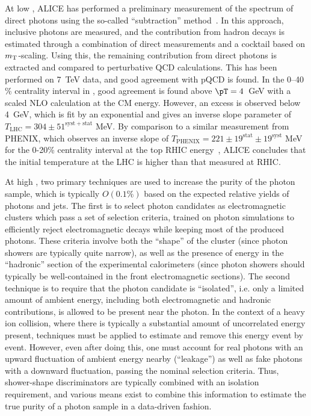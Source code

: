 At low \pT, ALICE has performed a preliminary measurement of the spectrum of direct photons
using the so-called ``subtraction'' method~\cite{Wilde:2012wc}.
In this approach, inclusive photons are measured,
and the contribution from hadron decays is estimated through a combination of direct measurements
and a cocktail based on $m_{\rm T}$-scaling.
Using this, the remaining contribution from direct photons is extracted and compared to
perturbative QCD calculations.  This has been performed on 7~TeV \pp data, and good agreement
with pQCD is found.  In the 0--40\,\% centrality interval in \PbPb, good agreement is found above
$\pT=4$~GeV with a scaled NLO calculation at the \PbPb CM energy.  However, an excess is observed
below 4~GeV, which is fit by an exponential and gives an inverse slope parameter of
$T_{\mathrm{LHC}} = 304 \pm 51^{\mathrm{syst+stat}}$ MeV.  By comparison to a similar
measurement from PHENIX, which observes an inverse slope of
$T_{\mathrm{PHENIX}}=221 \pm 19^{\mathrm{stat}} \pm 19^{\mathrm{syst}}$ MeV for the 0-20\%
centrality interval at the top RHIC energy~\cite{Adare:2008ab},
ALICE concludes that the initial temperature at the LHC is higher
than that measured at RHIC.

At high \pT, two primary techniques are used to increase the purity of the photon sample, which is typically
$O(0.1\%)$ based on the expected relative yields of photons and jets.  The first is to select
photon candidates as electromagnetic clusters which pass a set of selection criteria, trained on
photon simulations to efficiently reject electromagnetic decays while keeping most of the
produced photons.  These criteria involve both the ``shape'' of the cluster (since photon showers
are typically quite narrow), as well as the presence of energy in the ``hadronic'' section of the
experimental calorimeters (since photon showers should typically be well-contained in the front
electromagnetic sections).
The second technique is to require that the photon candidate is ``isolated'', i.e. only a limited
amount of ambient energy, including both electromagnetic and hadronic contributions,
is allowed to be present near the photon.  In the context of a heavy ion collision, where there
is typically a substantial amount of uncorrelated energy present, techniques must be applied to
estimate and remove this energy event by event.  However, even after doing this, one must account
for real photons with an upward fluctuation of ambient energy nearby (``leakage'') as well
as fake photons with a downward fluctuation, passing the nominal selection criteria.
Thus, shower-shape discriminators are typically combined with an isolation requirement, and various
means exist to combine this information to estimate the true purity of a photon sample in a
data-driven fashion.

